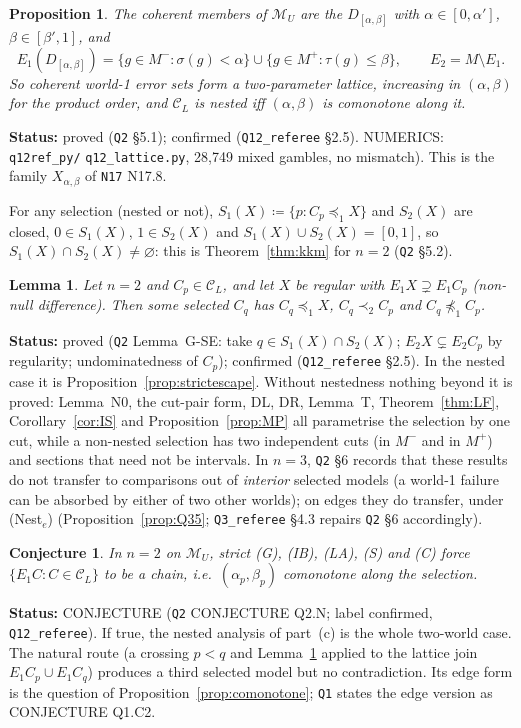 \documentclass[11pt]{article}
\newtheorem{lemma}[theorem]{Lemma}
\newtheorem{proposition}[theorem]{Proposition}
\newtheorem{conjecture}[theorem]{Conjecture}
\theoremstyle{definition}
\theoremstyle{remark}
\newcommand{\M}{\mathcal M}
\newcommand{\C}{\mathcal C}
\newcommand{\src}[1]{\texttt{#1}}
\newcommand{\status}[1]{\par\smallskip\noindent\textbf{Status:} #1\par\smallskip}
\begin{document}
\begin{proposition}\label{prop:lattice}
The coherent members of $\M_U$ are the $D_{[\alpha,\beta]}$ with $\alpha\in[0,\alpha']$, $\beta\in[\beta',1]$, and
\[
E_1(D_{[\alpha,\beta]})=\{g\in M^-:\sigma(g)<\alpha\}\cup\{g\in M^+:\tau(g)\le\beta\},\qquad E_2=M\setminus E_1 .
\]
So coherent world-1 error sets form a two-parameter lattice, increasing in $(\alpha,\beta)$ for the product order, and $\C_L$ is nested iff $(\alpha,\beta)$ is comonotone along it.
\end{proposition}
\status{proved (\src{Q2} \S5.1); confirmed (\src{Q12\_referee} \S2.5). NUMERICS: \src{q12ref\_py/} \src{q12\_lattice.py}, 28{,}749 mixed gambles, no mismatch). This is the family $X_{\alpha,\beta}$ of \src{N17} N17.8.}

For any selection (nested or not), $S_1(X)\coloneqq\{p:C_p\preceq_1X\}$ and $S_2(X)$ are closed, $0\in S_1(X)$, $1\in S_2(X)$ and $S_1(X)\cup S_2(X)=[0,1]$, so $S_1(X)\cap S_2(X)\ne\varnothing$: this is Theorem~\ref{thm:kkm} for $n=2$ (\src{Q2} \S5.2).

\begin{lemma}\label{lem:GSE}
Let $n=2$ and $C_p\in\C_L$, and let $X$ be regular with $E_1X\supsetneq E_1C_p$ (non-null difference). Then some selected $C_q$ has $C_q\preceq_1X$, $C_q\prec_2C_p$ and $C_q\not\preceq_1C_p$.
\end{lemma}
\status{proved (\src{Q2} Lemma~G-SE: take $q\in S_1(X)\cap S_2(X)$; $E_2X\subsetneq E_2C_p$ by regularity; undominatedness of $C_p$); confirmed (\src{Q12\_referee} \S2.5). In the nested case it is Proposition~\ref{prop:strictescape}. Without nestedness nothing beyond it is proved: Lemma~N0, the cut-pair form, DL, DR, Lemma~T, Theorem~\ref{thm:LF}, Corollary~\ref{cor:IS} and Proposition~\ref{prop:MP} all parametrise the selection by one cut, while a non-nested selection has two independent cuts (in $M^-$ and in $M^+$) and sections that need not be intervals. In $n=3$, \src{Q2} \S6 records that these results do not transfer to comparisons out of \emph{interior} selected models (a world-1 failure can be absorbed by either of two other worlds); on edges they do transfer, under (Nest$_e$) (Proposition~\ref{prop:Q35}; \src{Q3\_referee} \S4.3 repairs \src{Q2} \S6 accordingly).}

\begin{conjecture}\label{conj:Q2N}
In $n=2$ on $\M_U$, strict (G), (IB), (LA), (S) and (C) force $\{E_1C:C\in\C_L\}$ to be a chain, i.e.\ $(\alpha_p,\beta_p)$ comonotone along the selection.
\end{conjecture}
\status{CONJECTURE (\src{Q2} CONJECTURE Q2.N; label confirmed, \src{Q12\_referee}). If true, the nested analysis of part~(c) is the whole two-world case. The natural route (a crossing $p<q$ and Lemma~\ref{lem:GSE} applied to the lattice join $E_1C_p\cup E_1C_q$) produces a third selected model but no contradiction. Its edge form is the question of Proposition~\ref{prop:comonotone}; \src{Q1} states the edge version as CONJECTURE Q1.C2.}
\end{document}
